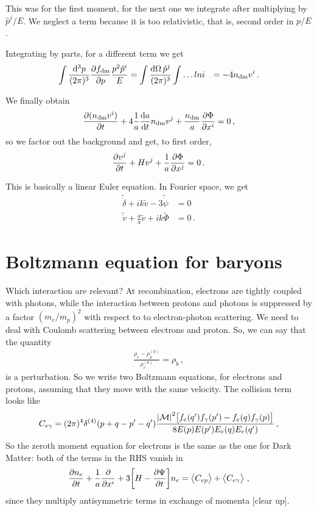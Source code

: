 \documentclass[main.tex]{subfiles}
\begin{document}
This was for the first moment, for the next one we integrate after multiplying by \(\hat{p}^{j} / E\). 
We neglect a term because it is too relativistic, that is, second order in \(p / E\). 

Integrating by parts, for a different term we get 
%
\begin{align}
\int  \frac{ \dd[3]{p}}{(2\pi )^3} \pdv{f _{\text{dm}}}{p} \frac{p^2 \hat{p}^{i}}{E} &= \int \frac{ \dd{\Omega  } \hat{p}^{j}}{(2 \pi )^3}
\int \dots lni
&= - 4 n _{\text{dm}} v^{i}
\,.
\end{align}

We finally obtain 
%
\begin{align}
\pdv{(n _{\text{dm}} v^{i})}{t} + 4 \frac{1}{a} \dv{a}{t} n _{\text{dm}}v^{j} + \frac{n _{\text{dm}}}{a} \pdv{\Phi  }{x^{i}} =0
\,,
\end{align}
%
so we factor out the background and get, to first order, 
%
\begin{align}
\pdv{v^{j}}{t} + H v^{j} + \frac{1}{a} \pdv{\Phi }{x^{j}}=0
\,.
\end{align}

This is basically a linear Euler equation. In Fourier space, we get 
%
\begin{align}
\widetilde{\dot{\delta}} + i k \widetilde{v} - 3 \widetilde{\dot{\psi}} &= 0  \\
\widetilde{\dot{v}} + \frac{\dot{a}}{a} \widetilde{v} + i k \widetilde{\Phi} &= 0
\,.
\end{align}

\section{Boltzmann equation for baryons}

Which interaction are relevant? 
At recombination, electrons are tightly coupled with photons, while the interaction between protons and photons is suppressed by a factor \((m_{e} / m_p)^2\) with respect to to electron-photon scattering.
We need to deal with Coulomb scattering between electrons and proton. 
So, we can say that the quantity 
%
\begin{align}
\frac{ \rho_{e} - \rho_{p}^{(0)}}{\rho_{e}^{(0)}}  =
\rho_{b}
\,,
\end{align}
%
is a perturbation. So we write two Boltzmann equations, for electrons and protons, assuming that they move with the same velocity. The collision term looks like 
%
\begin{align}
C_{e \gamma }= (2 \pi)^{4} \delta^{(4)} (p + q - p' - q') 
\frac{ \abs{\mathcal{M}}^2 \qty[f_{e}(q') f_{\gamma }(p') - f_e (q) f_\gamma (p)] }{8 E(p) E(p') E_e(q) E_e(q')}
\,,
\end{align}
%
So the zeroth moment equation for electrons is the same as the one for Dark Matter: both of the terms in the RHS vanish in
%
\begin{align}
\pdv{n_e}{t} + \frac{1}{a} \pdv{}{x^{i}} (n_e v^{i}_{b}) + 3 \qty[H - \pdv{\Psi }{t}]n_e = \expval{C_{ep}} + \expval{C_{e \gamma }}
\,,
\end{align}
%
since they multiply antisymmetric terms in exchange of momenta [clear up]. 
\end{document}

